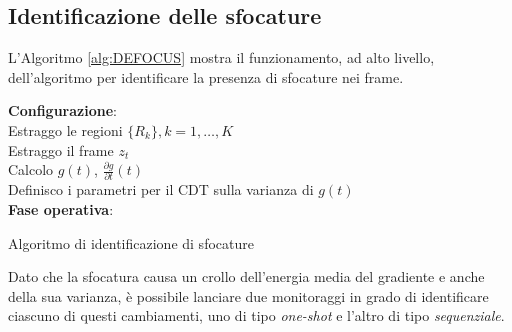 \subsection{Identificazione delle sfocature}
\label{defocusDetection}
L'Algoritmo \ref{alg:DEFOCUS} mostra il funzionamento, ad alto livello, dell'algoritmo per identificare la presenza di sfocature nei frame.
\begin{algorithm}[tp]
	\LinesNumbered
	\textbf{Configurazione}:\\
	 Estraggo le regioni $\{R_k\}, k=1,\dots,K$  \\
	 
	{	 Estraggo il frame $z_t$ \\
		 
		 Calcolo $g(t)$, $\frac{\partial g}{\partial t}(t)$ \\
	}
	 
	 Definisco i parametri per il CDT sulla varianza di $g(t)$\\
	\textbf{Fase operativa}:\\
	    
	\caption{Algoritmo di identificazione di sfocature}
	\label{alg:DEFOCUS}
\end{algorithm}
Dato che la sfocatura causa un crollo dell'energia media del gradiente e anche della sua varianza, \`e possibile lanciare due monitoraggi in grado di identificare ciascuno di questi cambiamenti, uno di tipo \textit{one-shot} e l'altro di tipo \textit{sequenziale}.\\
